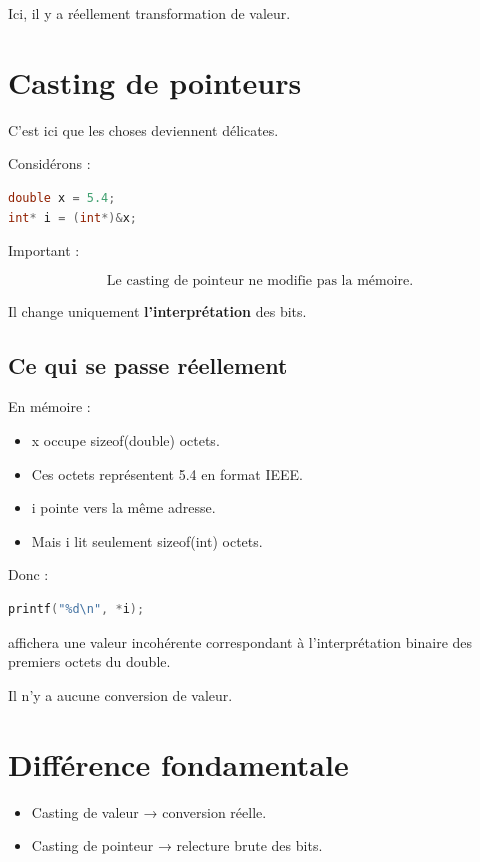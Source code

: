 Ici, il y a réellement transformation de valeur.

\section{Casting de pointeurs}

C’est ici que les choses deviennent délicates.

Considérons :

\begin{lstlisting}[language=C]
double x = 5.4;
int* i = (int*)&x;
\end{lstlisting}

Important :

\[
\boxed{
\text{Le casting de pointeur ne modifie pas la mémoire.}
}
\]

Il change uniquement \textbf{l’interprétation} des bits.

\subsection{Ce qui se passe réellement}

En mémoire :

\begin{itemize}
\item x occupe sizeof(double) octets.
\item Ces octets représentent 5.4 en format IEEE.
\item i pointe vers la même adresse.
\item Mais i lit seulement sizeof(int) octets.
\end{itemize}

Donc :

\begin{lstlisting}[language=C]
printf("%d\n", *i);
\end{lstlisting}

affichera une valeur incohérente correspondant
à l’interprétation binaire des premiers octets du double.

Il n’y a aucune conversion de valeur.

\section{Différence fondamentale}

\begin{itemize}
\item Casting de valeur → conversion réelle.
\item Casting de pointeur → relecture brute des bits.
\end{itemize}

